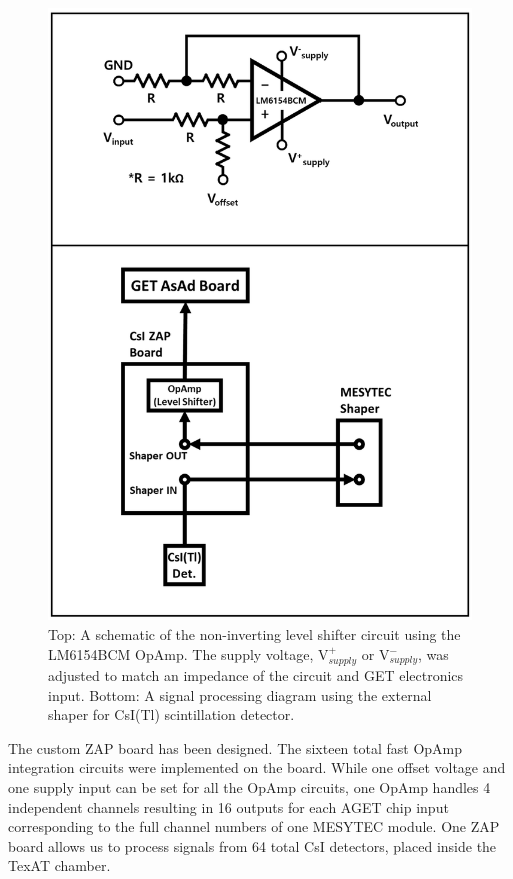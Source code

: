 \documentclass[final,number,sort&compress,5p,times,twocolumn]{elsarticle}
\begin{document}
\begin{figure}[hbt!]
	\centering
	\includegraphics[width=1.0\columnwidth]{Figs/CsIZAP_circuit}
	\caption{Top: A schematic of the non-inverting level shifter circuit using the LM6154BCM OpAmp. The supply voltage, V$^{+}_{supply}$ or V$^{-}_{supply}$, was adjusted to match an impedance of the circuit and GET electronics input. Bottom: A signal processing diagram using the external shaper for CsI(Tl) scintillation detector.}
	\label{fig:CsIZAP_circuit}
\end{figure}
 
The custom ZAP board has been designed. The sixteen total fast OpAmp integration circuits were implemented on the board. While one offset voltage and one supply input can be set for all the OpAmp circuits, one OpAmp handles 4 independent channels resulting in 16 outputs for each AGET chip input corresponding to the full channel numbers of one MESYTEC module. One ZAP board allows us to process signals from 64 total CsI detectors, placed inside the TexAT chamber.
\end{document}
